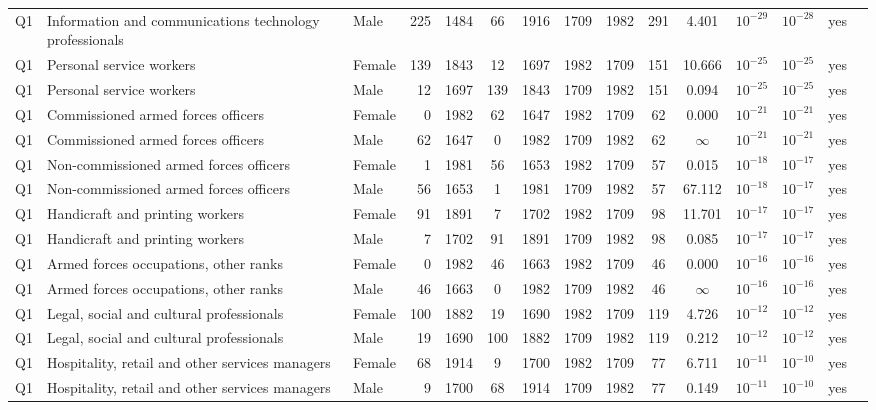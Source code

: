 \begin{longtable}{lllrcccccccccll}
Q1 & Information and communications technology professionals & Male & 225 & 1484 & 66 & 1916 & 1709 & 1982 & 291 & 4.401 & $10^{-29}$ & $10^{-28}$ & yes \\
Q1 & Personal service workers & Female & 139 & 1843 & 12 & 1697 & 1982 & 1709 & 151 & 10.666 & $10^{-25}$ & $10^{-25}$ & yes \\
Q1 & Personal service workers & Male & 12 & 1697 & 139 & 1843 & 1709 & 1982 & 151 & 0.094 & $10^{-25}$ & $10^{-25}$ & yes \\
Q1 & Commissioned armed forces officers & Female & 0 & 1982 & 62 & 1647 & 1982 & 1709 & 62 & 0.000 & $10^{-21}$ & $10^{-21}$ & yes \\
Q1 & Commissioned armed forces officers & Male & 62 & 1647 & 0 & 1982 & 1709 & 1982 & 62 & $\infty$ & $10^{-21}$ & $10^{-21}$ & yes \\
Q1 & Non-commissioned armed forces officers & Female & 1 & 1981 & 56 & 1653 & 1982 & 1709 & 57 & 0.015 & $10^{-18}$ & $10^{-17}$ & yes \\
Q1 & Non-commissioned armed forces officers & Male & 56 & 1653 & 1 & 1981 & 1709 & 1982 & 57 & 67.112 & $10^{-18}$ & $10^{-17}$ & yes \\
Q1 & Handicraft and printing workers & Female & 91 & 1891 & 7 & 1702 & 1982 & 1709 & 98 & 11.701 & $10^{-17}$ & $10^{-17}$ & yes \\
Q1 & Handicraft and printing workers & Male & 7 & 1702 & 91 & 1891 & 1709 & 1982 & 98 & 0.085 & $10^{-17}$ & $10^{-17}$ & yes \\
Q1 & Armed forces occupations, other ranks & Female & 0 & 1982 & 46 & 1663 & 1982 & 1709 & 46 & 0.000 & $10^{-16}$ & $10^{-16}$ & yes \\
Q1 & Armed forces occupations, other ranks & Male & 46 & 1663 & 0 & 1982 & 1709 & 1982 & 46 & $\infty$ & $10^{-16}$ & $10^{-16}$ & yes \\
Q1 & Legal, social and cultural professionals & Female & 100 & 1882 & 19 & 1690 & 1982 & 1709 & 119 & 4.726 & $10^{-12}$ & $10^{-12}$ & yes \\
Q1 & Legal, social and cultural professionals & Male & 19 & 1690 & 100 & 1882 & 1709 & 1982 & 119 & 0.212 & $10^{-12}$ & $10^{-12}$ & yes \\
Q1 & Hospitality, retail and other services managers & Female & 68 & 1914 & 9 & 1700 & 1982 & 1709 & 77 & 6.711 & $10^{-11}$ & $10^{-10}$ & yes \\
Q1 & Hospitality, retail and other services managers & Male & 9 & 1700 & 68 & 1914 & 1709 & 1982 & 77 & 0.149 & $10^{-11}$ & $10^{-10}$ & yes \\

\end{longtable}
